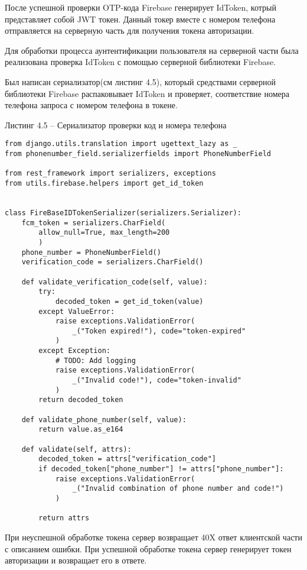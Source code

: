 После успешной проверки OTP-кода Firebase генерирует IdToken, котрый представляет собой JWT токен.
Данный токер вместе с номером телефона отправляется на серверную часть для получения токена авторизации.

Для обработки процесса аунтентификации пользователя на серверной части была реализована проверка IdToken с помощью серверной библиотеки Firebase.


Был написан сериализатор(см листинг 4.5), который средствами серверной библиотеки Firebase распаковывает IdToken и проверяет, соответствие номера телефона запроса с номером телефона в токене.

Листинг 4.5 – Сериализатор проверки код и номера телефона
\begin{lstlisting}
from django.utils.translation import ugettext_lazy as _
from phonenumber_field.serializerfields import PhoneNumberField

from rest_framework import serializers, exceptions
from utils.firebase.helpers import get_id_token


class FireBaseIDTokenSerializer(serializers.Serializer):
    fcm_token = serializers.CharField(
        allow_null=True, max_length=200
        )
    phone_number = PhoneNumberField()
    verification_code = serializers.CharField()

    def validate_verification_code(self, value):
        try:
            decoded_token = get_id_token(value)
        except ValueError:
            raise exceptions.ValidationError(
                _("Token expired!"), code="token-expired"
            )
        except Exception:
            # TODO: Add logging
            raise exceptions.ValidationError(
                _("Invalid code!"), code="token-invalid"
            )
        return decoded_token

    def validate_phone_number(self, value):
        return value.as_e164

    def validate(self, attrs):
        decoded_token = attrs["verification_code"]
        if decoded_token["phone_number"] != attrs["phone_number"]:
            raise exceptions.ValidationError(
                _("Invalid combination of phone number and code!")
            )

        return attrs

\end{lstlisting}

При неуспешной обработке токена сервер возвращает 40X ответ клиентской части с описанием ошибки.
При успешной обработке токена сервер генерирует токен авторизации и возвращает его в ответе.

